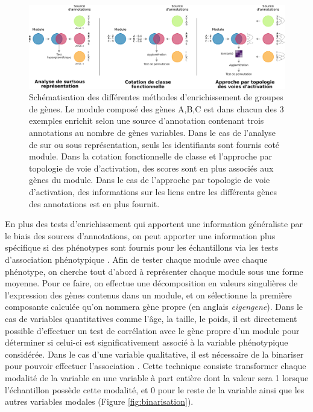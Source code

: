 \begin{figure}
    \centering
    \includegraphics[width=\textwidth]{img/intro/3_coexpr/intro_3_coexpr_enrichment_methods.pdf} 
    \caption[Schématisation des différentes méthodes d'enrichissement de groupes de gènes.]{Schématisation des différentes méthodes d'enrichissement de groupes de gènes. Le module composé des gènes A,B,C est dans chacun des 3 exemples enrichit selon une source d'annotation contenant trois annotations au nombre de gènes variables. Dans le cas de l'analyse de sur ou sous représentation, seuls les identifiants sont fournis coté module. Dans la cotation fonctionnelle de classe et l'approche par topologie de voie d'activation, des scores sont en plus associés aux gènes du module. Dans le cas de l'approche par topologie de voie d'activation, des informations sur les liens entre les différents gènes des annotations est en plus fournit.}
    \label{fig:enrichment_methods}
\end{figure}


En plus des tests d'enrichissement qui apportent une information généraliste par le biais des sources d'annotations, on peut apporter une information plus spécifique si des phénotypes sont fournis pour les échantillons via les tests d'association phénotypique \cite{Langfelder2008}. Afin de tester chaque module avec chaque phénotype, on cherche tout d'abord à représenter chaque module sous une forme moyenne. Pour ce faire, on effectue une décomposition en valeurs singulières de l'expression des gènes contenus dans un module, et on sélectionne la première composante calculée qu'on nommera gène propre (en anglais \textit{eigengene}). Dans le cas de variables quantitatives comme l'âge, la taille, le poids, il est directement possible d'effectuer un test de corrélation avec le gène propre d'un module pour déterminer si celui-ci est significativement associé à la variable phénotypique considérée. Dans le cas d'une variable qualitative, il est nécessaire de la binariser pour pouvoir effectuer l'association \cite{Lemoine2021Dec}. Cette technique consiste transformer chaque modalité de la variable en une variable à part entière dont la valeur sera 1 lorsque l'échantillon possède cette modalité, et 0 pour le reste de la variable ainsi que les autres variables modales (Figure \ref{fig:binarisation}).

